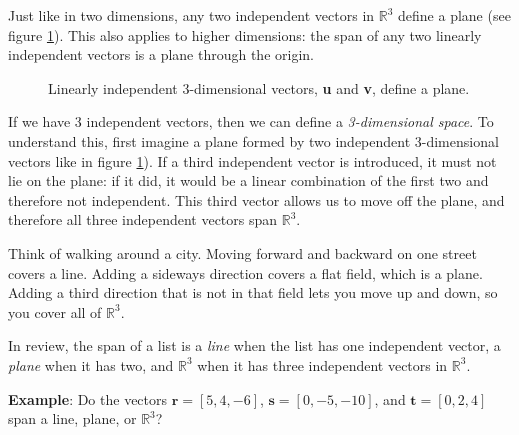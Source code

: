Just like in two dimensions, any two independent vectors in $\mathbb{R}^3$ 
define a plane (see figure \ref{fig:plane-span}). This also applies to higher dimensions: the span of any two linearly independent vectors is a plane through the origin. 

\begin{figure}[H]
\centering
{}
\caption{Linearly independent 3-dimensional vectors, \textbf{u} and \textbf{v}, 
define a plane.}
\label{fig:plane-span}
\end{figure}

If we have 3 independent vectors, then we can define a \textit{3-dimensional 
space}. To understand this, first imagine a plane formed by two independent 
3-dimensional vectors like in figure \ref{fig:plane-span}). If a third independent 
vector is introduced, it must not lie on the plane: if it did, it would be a 
linear combination of the first two and therefore not independent. This third 
vector allows us to move off the plane, and therefore all three independent 
vectors span $\mathbb{R}^3$. 

Think of walking around a city. Moving forward and backward on one street covers a line. Adding a sideways direction covers a flat field, which is a plane. Adding a third direction that is not in that field lets you move up and down, so you cover all of $\mathbb{R}^3$.

In review, the span of a list is a \textit{line} when the list has one independent vector, a \textit{plane} when it has two, and $\mathbb{R}^3$ when it has three independent vectors in $\mathbb{R}^3$. 

\textbf{Example}: Do the vectors $\mathbf{r} = \left[ 5, 4, -6 \right]$, 
$\mathbf{s} = \left[ 0, -5, -10 \right]$, and $\mathbf{t} = \left[ 0, 2, 4 \right]$ span a line, plane, or $\mathbb{R}^3$?

